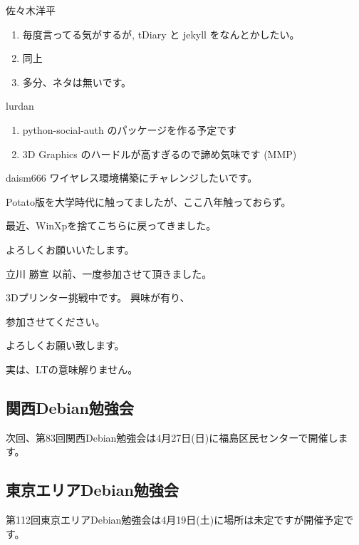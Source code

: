 \documentclass[mingoth,a4paper]{jsarticle}
\begin{document}
\begin{prework}{ 佐々木洋平 }
  \begin{enumerate}
  \item 毎度言ってる気がするが, tDiary と jekyll をなんとかしたい。
  \item 同上
  \item 多分、ネタは無いです。
  \end{enumerate}
\end{prework}

\begin{prework}{ lurdan }
  \begin{enumerate}
  \item python-social-auth のパッケージを作る予定です
  \item 3D Graphics のハードルが高すぎるので諦め気味です (MMP)
  \end{enumerate}
\end{prework}

\begin{prework}{ daism666 }
ワイヤレス環境構築にチャレンジしたいです。

Potato版を大学時代に触ってましたが、ここ八年触っておらず。

最近、WinXpを捨てこちらに戻ってきました。

よろしくお願いいたします。
\end{prework}

\begin{prework}{ 立川 勝宣 }
以前、一度参加させて頂きました。

3Dプリンター挑戦中です。
興味が有り、

参加させてください。

よろしくお願い致します。

実は、LTの意味解りません。
\end{prework}




\subsection{関西Debian勉強会}

次回、第83回関西Debian勉強会は4月27日(日)に福島区民センターで開催します。

\subsection{東京エリアDebian勉強会}
第112回東京エリアDebian勉強会は4月19日(土)に場所は未定ですが開催予定です。
\end{document}
